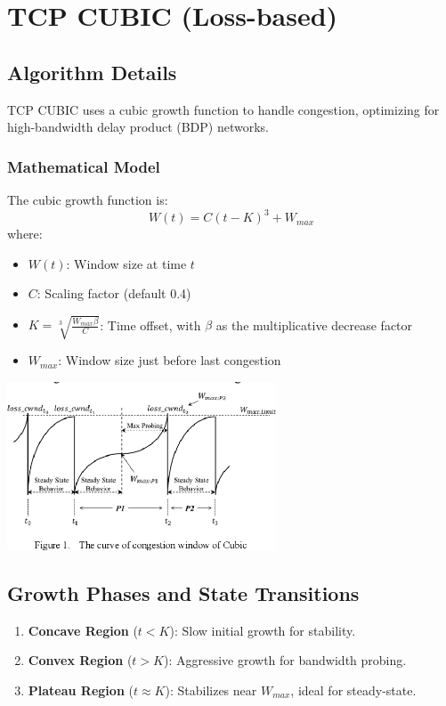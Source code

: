 \documentclass[11pt,a4paper]{article}
\begin{document}
\section{\textcolor{sectioncolor}{TCP CUBIC (Loss-based)}}
\begin{tcolorbox}[colback=purple!5!white, colframe=purple!75!black, fonttitle=\bfseries, title=TCP CUBIC Overview]
\subsection{{Algorithm Details}}
TCP CUBIC uses a cubic growth function to handle congestion, optimizing for high-bandwidth delay product (BDP) networks.

\subsubsection*{Mathematical Model}
The cubic growth function is:
\begin{equation}
W(t) = C(t-K)^3 + W_{max}
\end{equation}
where:
\begin{itemize}
    \item $W(t)$: Window size at time $t$
    \item $C$: Scaling factor (default 0.4)
    \item $K = \sqrt[3]{\frac{W_{max}\beta}{C}}$: Time offset, with $\beta$ as the multiplicative decrease factor
    \item $W_{max}$: Window size just before last congestion
\end{itemize}
\begin{center}
    \includegraphics[width=0.6\textwidth]{images/tcp_cubic.png}
\end{center}

\subsection{{Growth Phases and State Transitions}}
\begin{enumerate}[label=\roman*]
    \item \textbf{Concave Region} ($t < K$): Slow initial growth for stability.
    \item \textbf{Convex Region} ($t > K$): Aggressive growth for bandwidth probing.
    \item \textbf{Plateau Region} ($t \approx K$): Stabilizes near $W_{max}$, ideal for steady-state.
\end{enumerate}

\end{tcolorbox}
\end{document}
